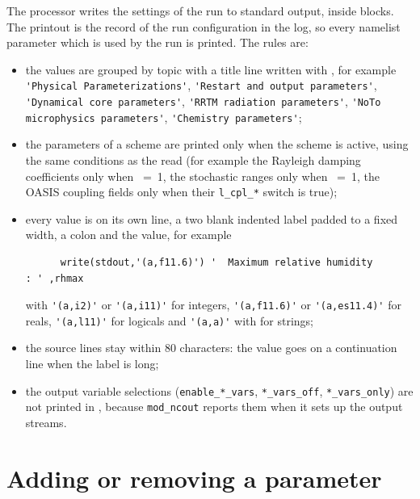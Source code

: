 The processor  writes the settings of the run to standard
output, inside  blocks. The printout is the
record of the run configuration in the log, so every namelist parameter
which is used by the run is printed. The rules are:
\begin{itemize}
  \item the values are grouped by topic with a title line written with
        , for example \verb='Physical Parameterizations'=,
        \verb='Restart and output parameters'=,
        \verb='Dynamical core parameters'=, \verb='RRTM radiation parameters'=,
        \verb='NoTo microphysics parameters'=, \verb='Chemistry parameters'=;
  \item the parameters of a scheme are printed only when the scheme is
        active, using the same conditions as the read (for example the
        Rayleigh damping coefficients only when ~=~1, the
        stochastic ranges only when ~=~1, the OASIS
        coupling fields only when their \verb=l_cpl_*= switch is true);
  \item every value is on its own line, a two blank indented label padded
        to a fixed width, a colon and the value, for example
\begin{verbatim}
      write(stdout,'(a,f11.6)') '  Maximum relative humidity         : ' ,rhmax
\end{verbatim}
        with \verb='(a,i2)'= or \verb='(a,i11)'= for integers,
        \verb='(a,f11.6)'= or \verb='(a,es11.4)'= for reals,
        \verb='(a,l11)'= for logicals and \verb='(a,a)'= with  for
        strings;
  \item the source lines stay within 80 characters: the value goes on a
        continuation line when the label is long;
  \item the output variable selections (\verb=enable_*_vars=,
        \verb=*_vars_off=, \verb=*_vars_only=) are not printed in
        , because \verb=mod_ncout= reports them when it sets
        up the output streams.
\end{itemize}

\section{Adding or removing a parameter}

